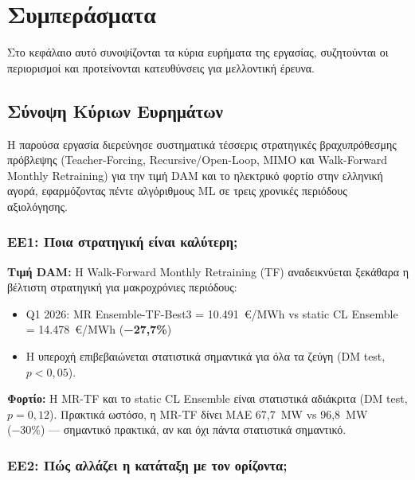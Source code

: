 \chapter{Συμπεράσματα}
\label{ch:conclusions}

Στο κεφάλαιο αυτό συνοψίζονται τα κύρια ευρήματα της εργασίας, συζητούνται
οι περιορισμοί και προτείνονται κατευθύνσεις για μελλοντική έρευνα.

\section{Σύνοψη Κύριων Ευρημάτων}
\label{sec:conc_findings}

Η παρούσα εργασία διερεύνησε συστηματικά τέσσερις στρατηγικές βραχυπρόθεσμης
πρόβλεψης (Teacher-Forcing, Recursive/Open-Loop, MIMO και Walk-Forward Monthly
Retraining) για την τιμή DAM και το ηλεκτρικό φορτίο στην ελληνική αγορά,
εφαρμόζοντας πέντε αλγόριθμους ML σε τρεις χρονικές περιόδους αξιολόγησης.

\subsection*{ΕΕ1: Ποια στρατηγική είναι καλύτερη;}

\textbf{Τιμή DAM:} Η Walk-Forward Monthly Retraining (TF) αναδεικνύεται
ξεκάθαρα η βέλτιστη στρατηγική για μακροχρόνιες περιόδους:
\begin{itemize}
    \item Q1 2026: MR Ensemble-TF-Best3 = 10.491~€/MWh vs
    static CL Ensemble = 14.478~€/MWh (\textbf{−27,7\%})
    \item Η υπεροχή επιβεβαιώνεται στατιστικά σημαντικά για όλα τα ζεύγη
    (DM test, $p < 0{,}05$).
\end{itemize}

\textbf{Φορτίο:} Η MR-TF και το static CL Ensemble είναι στατιστικά
αδιάκριτα (DM test, $p = 0{,}12$). Πρακτικά ωστόσο, η MR-TF δίνει
MAE 67,7~MW vs 96,8~MW (−30\%) — σημαντικό πρακτικά, αν και όχι
πάντα στατιστικά σημαντικό.

\subsection*{ΕΕ2: Πώς αλλάζει η κατάταξη με τον ορίζοντα;}

